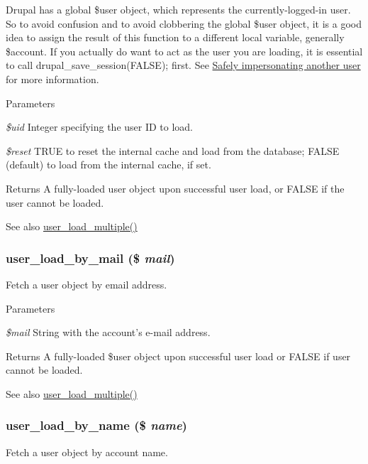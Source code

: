 Drupal has a global \$user object, which represents the currently-\/logged-\/in user. So to avoid confusion and to avoid clobbering the global \$user object, it is a good idea to assign the result of this function to a different local variable, generally \$account. If you actually do want to act as the user you are loading, it is essential to call drupal\_\-save\_\-session(FALSE); first. See \hyperlink{}{Safely impersonating another user } for more information.


\begin{DoxyParams}{Parameters}
\item[{\em \$uid}]Integer specifying the user ID to load. \item[{\em \$reset}]TRUE to reset the internal cache and load from the database; FALSE (default) to load from the internal cache, if set.\end{DoxyParams}
\begin{DoxyReturn}{Returns}
A fully-\/loaded user object upon successful user load, or FALSE if the user cannot be loaded.
\end{DoxyReturn}
\begin{DoxySeeAlso}{See also}
\hyperlink{user_8module_a9f73ad4a543faed0e38e8ea170bff32e}{user\_\-load\_\-multiple()} 
\end{DoxySeeAlso}
\hypertarget{user_8module_a68a9c7c15776d0ad6d0f7eb85e294c2d}{
\subsubsection[{user\_\-load\_\-by\_\-mail}]{\setlength{\rightskip}{0pt plus 5cm}user\_\-load\_\-by\_\-mail (\$ {\em mail})}}
\label{user_8module_a68a9c7c15776d0ad6d0f7eb85e294c2d}
Fetch a user object by email address.


\begin{DoxyParams}{Parameters}
\item[{\em \$mail}]String with the account's e-\/mail address. \end{DoxyParams}
\begin{DoxyReturn}{Returns}
A fully-\/loaded \$user object upon successful user load or FALSE if user cannot be loaded.
\end{DoxyReturn}
\begin{DoxySeeAlso}{See also}
\hyperlink{user_8module_a9f73ad4a543faed0e38e8ea170bff32e}{user\_\-load\_\-multiple()} 
\end{DoxySeeAlso}
\hypertarget{user_8module_a2abc1fc7de4cd56af7658688c3614f86}{
\subsubsection[{user\_\-load\_\-by\_\-name}]{\setlength{\rightskip}{0pt plus 5cm}user\_\-load\_\-by\_\-name (\$ {\em name})}}
\label{user_8module_a2abc1fc7de4cd56af7658688c3614f86}
Fetch a user object by account name.


